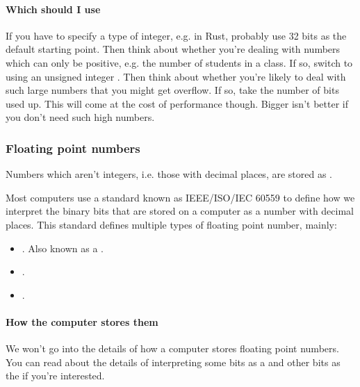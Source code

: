 \documentclass[letterpaper,10pt,british]{sphinxmanual}
\begin{document}
\paragraph{Which should I use}
\label{\detokenize{chapters/programming_fundamentals/integers:which-should-i-use}}
\sphinxAtStartPar
If you have to specify a type of integer, e.g. in Rust, probably use 32 bits  as the default starting point. Then think about whether you’re dealing with numbers which can only be positive, e.g. the number of students in a class. If so, switch to using an unsigned integer . Then think about whether you’re likely to deal with such large numbers that you might get overflow. If so, take the number of bits used up. This will come at the cost of performance though. Bigger isn’t better if you don’t need such high numbers.

\sphinxstepscope


\subsubsection{Floating point numbers}
\label{\detokenize{chapters/programming_fundamentals/floating_point_numbers:floating-point-numbers}}\label{\detokenize{chapters/programming_fundamentals/floating_point_numbers::doc}}
\sphinxAtStartPar
Numbers which aren’t integers, i.e. those with decimal places, are stored as .

\sphinxAtStartPar
Most computers use a standard known as IEEE/ISO/IEC 60559 to define how we interpret the binary bits that are stored on a computer as a number with decimal places. This standard defines multiple types of floating point number, mainly:
\begin{itemize}
\item {} 
\sphinxAtStartPar
{}. Also known as a .

\item {} 
\sphinxAtStartPar
{}.

\item {} 
\sphinxAtStartPar
{}.

\end{itemize}


\paragraph{How the computer stores them}
\label{\detokenize{chapters/programming_fundamentals/floating_point_numbers:how-the-computer-stores-them}}
\sphinxAtStartPar
We won’t go into the details of how a computer stores floating point numbers. You can read about the details of interpreting some bits as a  and other bits as the   if you’re interested.
\end{document}

